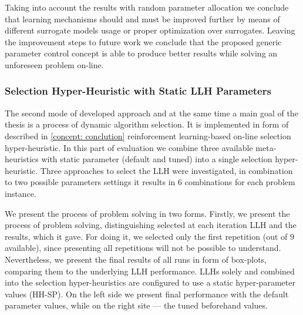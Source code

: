 Taking into account the results with random parameter allocation we conclude that learning mechanisms should and must be improved further by means of different surrogate models usage or proper optimization over surrogates. Leaving the improvement steps to future work we conclude that the proposed generic parameter control concept is able to produce better results while solving an unforeseen problem on-line.


\subsubsection{Selection Hyper-Heuristic with Static LLH Parameters}
The second mode of developed approach and at the same time a main goal of the thesis is a process of dynamic algorithm selection. It is implemented in form of described in \cref{concept: conclution} reinforcement learning-based on-line selection hyper-heuristic. In this part of evaluation we combine three available meta-heuristics with static parameter (default and tuned) into a single selection hyper-heuristic. Three approaches to select the LLH were investigated, in combination to two possible parameters settings it results in 6 combinations for each problem instance.

We present the process of problem solving in two forms. Firstly, we present the process of problem solving, distinguishing selected at each iteration LLH and the results, which it gave. For doing it, we selected only the first repetition (out of 9 available), since presenting all repetitions will not be possible to understand. Nevertheless, we present the final results of all runs in form of box-plots, comparing them to the underlying LLH performance. LLHs solely and combined into the selection hyper-heuristics are configured to use a static hyper-parameter values (HH-SP). On the left side we present final performance with the default parameter values, while on the right site — the tuned beforehand values.

\newpage
